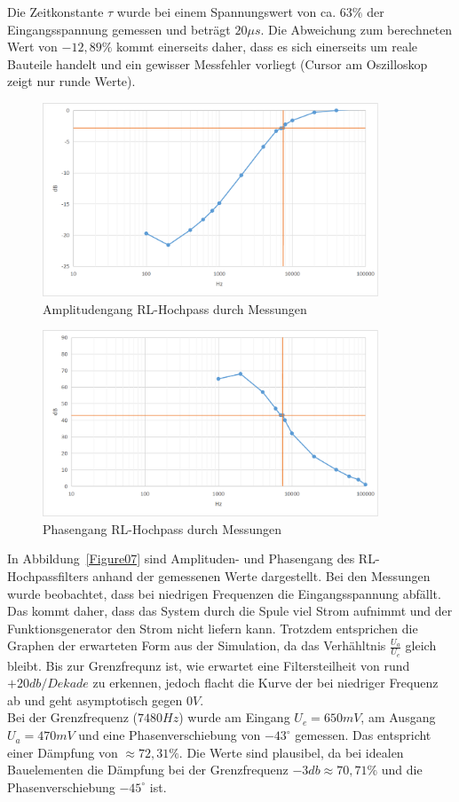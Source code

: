 \documentclass[12pt,a4paper,titlepage]{article}
\begin{document}
\noindent Die Zeitkonstante $\tau$ wurde bei einem Spannungswert von ca. $63 \%$ der Eingangsspannung gemessen und betr\"agt $20 \mu s$. Die Abweichung zum berechneten Wert von $-12,89 \%$ kommt einerseits daher, dass es sich einerseits um reale Bauteile handelt und ein gewisser Messfehler vorliegt (Cursor am Oszilloskop zeigt nur runde Werte).

\begin{figure}[H]
  \centering
  \includegraphics[width=100mm]{amplitudengang_rl_hochpass.png}
  \caption{Amplitudengang RL-Hochpass durch Messungen}
  \label{Figure08}
\end{figure}
\begin{figure}[H]
  \centering
  \includegraphics[width=100mm]{phasengang_rl_hochpass.png}
  \caption{Phasengang RL-Hochpass durch Messungen}
  \label{Figure09}
\end{figure}
\noindent In Abbildung~\ref{Figure07} sind Amplituden- und Phasengang des RL-Hochpassfilters anhand der gemessenen Werte dargestellt. Bei den Messungen wurde beobachtet, dass bei niedrigen Frequenzen die Eingangsspannung abf\"allt. Das kommt daher, dass das System durch die Spule viel Strom aufnimmt und der Funktionsgenerator den Strom nicht liefern kann. Trotzdem entsprichen die Graphen  der erwarteten Form aus der Simulation, da das Verh\"ahltnis $\frac{U_a}{U_e}$ gleich bleibt. Bis zur Grenzfrequnz ist, wie erwartet eine Filtersteilheit von rund $+20 db/Dekade$ zu erkennen, jedoch flacht die Kurve der bei niedriger Frequenz ab und geht asymptotisch gegen $0V$.\\
Bei der Grenzfrequenz ($7480 Hz$) wurde am Eingang $U_e = 650mV$, am Ausgang $U_a = 470mV$ und eine Phasenverschiebung von $-43^{\circ}$ gemessen. Das entspricht einer D\"ampfung von $\approx 72,31\%$. Die Werte sind plausibel, da bei idealen Bauelementen die D\"ampfung bei der Grenzfrequenz $-3db \approx 70,71\%$ und die Phasenverschiebung $-45^{\circ}$ ist.
\end{document}
